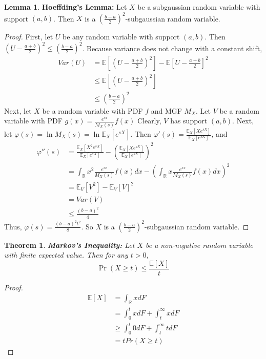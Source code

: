 \documentclass{article}
\newtheorem{theorem}{Theorem}
\theoremstyle{definition}\newtheorem{definition}{DEF}
\theoremstyle{definition}\newtheorem{example}{Ex}
\theoremstyle{lemma}\newtheorem{lemma}{Lemma}
\theoremstyle{corrolary}\newtheorem{corrolary}{Cor}
\begin{document}
\begin{lemma}
\textbf{Hoeffding's Lemma:}
Let $X$ be a subgaussian random variable with support $(a,b)$.
Then $X$ is a $\left(\frac{b-a}{2}\right)^2$-subgaussian random variable.
\end{lemma}
\begin{proof}
First, let $U$ be any random variable with support $(a,b)$.
Then $(U-\frac{a+b}{2})^2 \leq (\frac{b-a}{2})^2$.
Because variance does not change with a constant shift,
\begin{align*}
Var(U) &= \mathbb{E}\left[\left(U-\frac{a+b}{2}\right)^2\right] - \mathbb{E}\left[U-\frac{a+b}{2}\right]^2 \\
&\leq \mathbb{E}\left[\left(U-\frac{a+b}{2}\right)^2\right]\\
&\leq \left(\frac{b-a}{2}\right)^2
\end{align*}
Next, let $X$ be a random variable with PDF $f$ and MGF $M_X$.
Let $V$ be a random variable with PDF $g(x)=\frac{e^{sx}}{M_X(s)} f(x)$
Clearly, $V$ has support $(a,b)$.
Next, let $\varphi(s)=\ln M_X(s)=\ln\mathbb{E}_X[e^{sX}]$.
Then $\varphi'(s)=\frac{\mathbb{E}_X[Xe^{sX}]}{\mathbb{E}_X[e^{sX}]}$, and
\begin{align*}
\varphi''(s) &= \frac{\mathbb{E}_X[X^2e^{sX}]}{\mathbb{E}_X[e^{sX}]} - \left( \frac{\mathbb{E}_X[Xe^{sX}]}{\mathbb{E}_X[e^{sX}]}\right)^2\\
&= \int_\mathbb{R} x^2 \frac{e^{sx}}{M_X(s)}f(x)dx - \left( \int_\mathbb{R} x \frac{e^{sx}}{M_X(s)} f(x)dx \right)^2\\
&=\mathbb{E}_V[V^2]-\mathbb{E}_V[V]^2\\
&=Var(V) \\
&\leq \frac{(b-a)^2}{4}
\end{align*}
Thus, $\varphi(s)=\frac{(b-a)^2t^2}{8}$.
So $X$ is a $\left(\frac{b-a}{2}\right)^2$-subgaussian random variable.
\end{proof}

\begin{theorem}
\textbf{Markov's Inequality:}
Let $X$ be a non-negative random variable with finite expected value.
Then for any $t>0$,
\begin{equation}
\Pr(X\geq t)\leq \frac{\mathbb{E}[X]}{t}
\end{equation}
\end{theorem}
\begin{proof}
\begin{align*}
\mathbb{E}[X] &= \int_\mathbb{R} xdF\\
&= \int_0^t xdF + \int_t^\infty xdF\\
&\geq \int_0^t 0dF + \int_t^\infty tdF\\
&=tPr(X\geq t)
\end{align*}
\end{proof}
\end{document}
